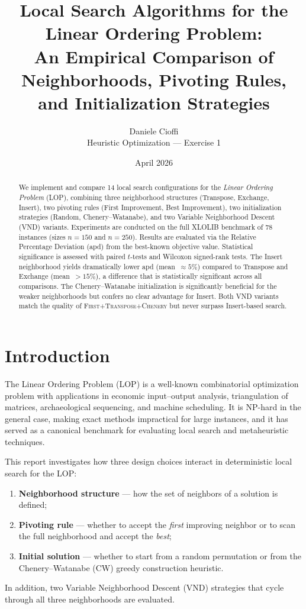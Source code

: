 \documentclass[11pt,a4paper]{article}
\title{\textbf{Local Search Algorithms for the Linear Ordering Problem:\\
An Empirical Comparison of Neighborhoods, Pivoting Rules, and Initialization Strategies}}
\author{Daniele Cioffi\\
\small Heuristic Optimization --- Exercise 1}
\date{April 2026}
\begin{document}
\maketitle

\begin{abstract}
We implement and compare 14 local search configurations for the
\emph{Linear Ordering Problem} (LOP), combining three neighborhood
structures (Transpose, Exchange, Insert), two pivoting rules
(First Improvement, Best Improvement), two initialization strategies
(Random, Chenery--Watanabe), and two Variable Neighborhood Descent
(VND) variants.  Experiments are conducted on the full XLOLIB benchmark
of 78 instances (sizes $n=150$ and $n=250$).  Results are evaluated via
the Relative Percentage Deviation (apd) from the best-known objective
value.  Statistical significance is assessed with paired $t$-tests and
Wilcoxon signed-rank tests.  The Insert neighborhood yields dramatically
lower apd (mean~$\approx 5\%$) compared to Transpose and Exchange
(mean~$>15\%$), a difference that is statistically significant across
all comparisons.  The Chenery--Watanabe initialization is significantly
beneficial for the weaker neighborhoods but confers no clear advantage
for Insert.  Both VND variants match the quality of
\textsc{First}+\textsc{Transpose}+\textsc{Chenery} but never surpass
Insert-based search.
\end{abstract}

\section{Introduction}

The Linear Ordering Problem (LOP) is a well-known combinatorial
optimization problem with applications in economic input--output
analysis, triangulation of matrices, archaeological sequencing, and
machine scheduling.
It is NP-hard in the general case, making exact methods impractical for
large instances, and it has served as a canonical benchmark for
evaluating local search and metaheuristic techniques.

This report investigates how three design choices interact in
deterministic local search for the LOP:
\begin{enumerate}
    \item \textbf{Neighborhood structure} --- how the set of neighbors of
          a solution is defined;
    \item \textbf{Pivoting rule} --- whether to accept the \emph{first}
          improving neighbor or to scan the full neighborhood and accept
          the \emph{best};
    \item \textbf{Initial solution} --- whether to start from a random
          permutation or from the Chenery--Watanabe (CW) greedy
          construction heuristic.
\end{enumerate}
In addition, two Variable Neighborhood Descent (VND) strategies that
cycle through all three neighborhoods are evaluated.
\end{document}
